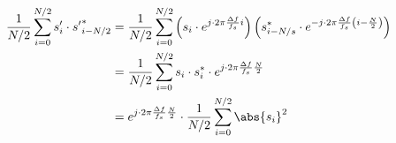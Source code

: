 \begin{varwidth}{12cm}
  \begin{align*}
    \label{eq:sc_peak_fqoff}
    \frac{1}{N/2} \sum_{i=0}^{N/2} s'_{i} \cdot {s'}_{i-N/2}^{\ast}
    &= \frac{1}{N/2} \sum_{i=0}^{N/2}
     \left( s_{i} \cdot e^{j\cdot 2 \pi \frac{\Delta f}{f_s}i} \right)
     \left( s_{i-N/s}^{\ast} \cdot e^{-j\cdot 2 \pi \frac{\Delta f}{f_s} \left( i- \frac{N}{2} \right)} \right) \nonumber \\
    &= \frac{1}{N/2} \sum_{i=0}^{N/2} s_{i} \cdot s_{i}^\ast \cdot e^{j\cdot 2 \pi \frac{\Delta f}{f_s} \frac{N}{2}} \nonumber \\
    &= e^{j\cdot 2 \pi \frac{\Delta f}{f_s} \frac{N}{2}} \cdot \frac{1}{N/2} \sum_{i=0}^{N/2} \abs{s_{i}}^2
  \end{align*}
\end{varwidth}
